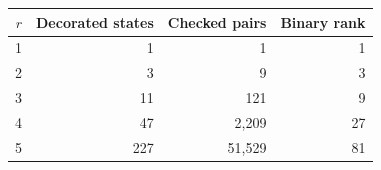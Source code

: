 \begin{tabular}{rrrr}
\toprule
$r$ & Decorated states & Checked pairs & Binary rank\\
\midrule
1 & 1 & 1 & 1\\
2 & 3 & 9 & 3\\
3 & 11 & 121 & 9\\
4 & 47 & 2,209 & 27\\
5 & 227 & 51,529 & 81\\
\bottomrule
\end{tabular}
